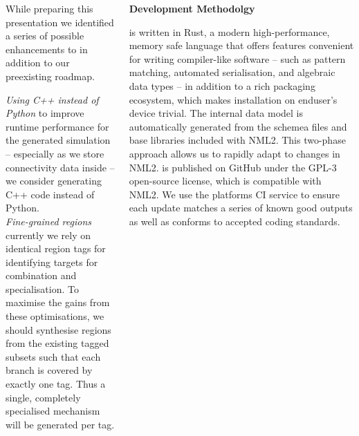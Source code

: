\documentclass{beamer}
\begin{document}
\begin{frame}[t, fragile]
\begin{columns}
\begin{column}{0.73\textwidth}
\begin{columns}[t]
\begin{column}[t]{0.49\textwidth}
          While preparing this presentation we identified a series of possible
          enhancements to \nmlcc in addition to our preexisting roadmap.

          \emph{Using C++ instead of Python} to improve runtime performance for the
          generated simulation -- especially as we store connectivity data inside --
          we consider generating C++ code instead of Python.\\[1.5ex]
          \emph{Fine-grained regions} currently we rely on identical region tags for
          identifying targets for combination and specialisation. To maximise the
          gains from these optimisations, we should synthesise regions from the
          existing tagged subsets such that each branch is covered by exactly one
          tag. Thus a single, completely specialised mechanism will be generated per
          tag.
        \end{column}
        \begin{column}[t]{0.49\textwidth}
          \textbf{Development Methodolgy}

          \nmlcc is written in Rust, a modern high-performance, memory safe
          language that offers features convenient for writing compiler-like
          software -- such as pattern matching, automated serialisation, and
          algebraic data types -- in addition to a rich packaging ecosystem, which
          makes installation on enduser's device trivial. The internal data model is
          automatically generated from the schemea files and base libraries included
          with NML2. This two-phase approach allows us to rapidly adapt to changes
          in NML2. \nmlcc is published on GitHub under the GPL-3 open-source
          license, which is compatible with NML2. We use the platforms CI service to
          ensure each update matches a series of known good outputs as well as
          conforms to accepted coding standards.
        \end{column}
      \end{columns}
    \end{column}


\end{columns}
\end{frame}
\end{document}
